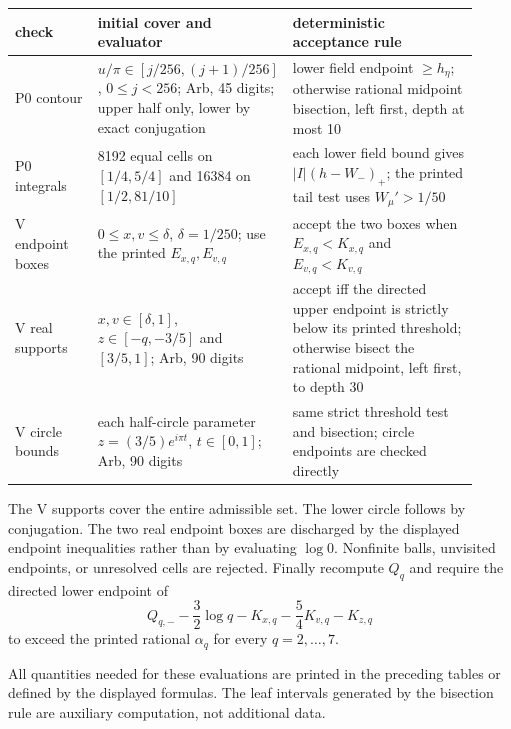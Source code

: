 \begin{center}
\begin{tabular}{@{}>{\raggedright\arraybackslash}p{0.18\linewidth}p{0.33\linewidth}p{0.41\linewidth}@{}}
\hline
check & initial cover and evaluator & deterministic acceptance rule\\
\hline
P0 contour & $u/\pi\in[j/256,(j+1)/256]$, $0\le j<256$; Arb, 45 digits; upper half only, lower by exact conjugation & lower field endpoint $\ge h_\eta$; otherwise rational midpoint bisection, left first, depth at most 10\\
P0 integrals & 8192 equal cells on $[1/4,5/4]$ and 16384 on $[1/2,81/10]$ & each lower field bound gives $|I|(h-W_-)_{+}$; the printed tail test uses $W_\mu'>1/50$\\
V endpoint boxes & $0\le x,v\le\delta$, $\delta=1/250$; use the printed $E_{x,q},E_{v,q}$ & accept the two boxes when $E_{x,q}<K_{x,q}$ and $E_{v,q}<K_{v,q}$\\
V real supports & $x,v\in[\delta,1]$, $z\in[-q,-3/5]$ and $[3/5,1]$; Arb, 90 digits & accept iff the directed upper endpoint is strictly below its printed threshold; otherwise bisect the rational midpoint, left first, to depth 30\\
V circle bounds & each half-circle parameter $z=(3/5)e^{i\pi t}$, $t\in[0,1]$; Arb, 90 digits & same strict threshold test and bisection; circle endpoints are checked directly\\
\hline
\end{tabular}
\end{center}
The V supports cover the entire admissible set.  The lower circle follows by
conjugation.  The two real endpoint boxes are discharged by the displayed
endpoint inequalities rather than by evaluating $\log 0$.  Nonfinite balls,
unvisited endpoints, or unresolved cells are rejected.
Finally recompute $Q_q$ and require the directed lower endpoint of
\[
 Q_{q,-}-\frac32\log q-K_{x,q}-\frac54K_{v,q}-K_{z,q}
\]
to exceed the printed rational $\alpha_q$ for every $q=2,\ldots,7$.

All quantities needed for these evaluations are printed in the preceding
tables or defined by the displayed formulas.  The leaf intervals generated by
the bisection rule are auxiliary computation, not additional data.
